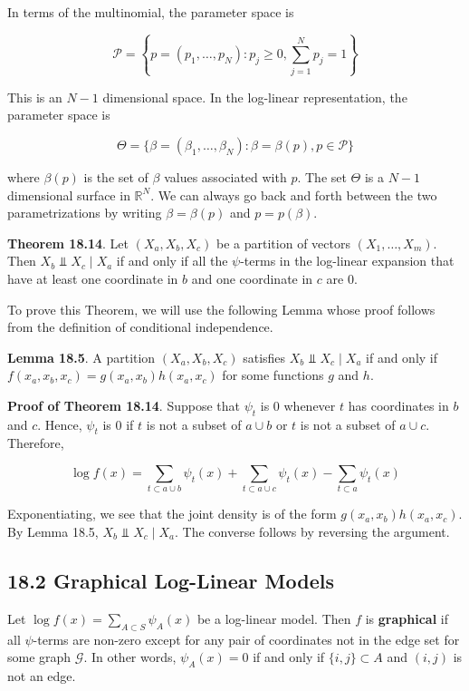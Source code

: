 In terms of the multinomial, the parameter space is

\[ \mathcal{P} = \left\{ p = (p_{1}, \dots, p_N) : p_{j} \geq 0, \sum_{j=1}^N p_{j} = 1 \right\} \]

This is an \(N - 1\) dimensional space. In the log-linear
representation, the parameter space is

\[ \Theta = \Bigg\{ \beta = (\beta_{1}, \dots, \beta_N) : \beta = \beta(p), p \in \mathcal{P} \Bigg\} \]

where \(\beta(p)\) is the set of \(\beta\) values associated with \(p\).
The set \(\Theta\) is a \(N - 1\) dimensional surface in
\(\mathbb{R}^N\). We can always go back and forth between the two
parametrizations by writing \(\beta = \beta(p)\) and \(p = p(\beta)\).

\textbf{Theorem 18.14}. Let \((X_a, X_b, X_c)\) be a partition of
vectors \((X_{1}, \dots, X_m)\). Then \(X_b \text{ ⫫ } X_c \; | \; X_a\)
if and only if all the \(\psi\)-terms in the log-linear expansion that
have at least one coordinate in \(b\) and one coordinate in \(c\) are 0.

To prove this Theorem, we will use the following Lemma whose proof
follows from the definition of conditional independence.

\textbf{Lemma 18.5}. A partition \((X_a, X_b, X_c)\) satisfies
\(X_b \text{ ⫫ } X_c \; | \; X_a\) if and only if
\(f(x_a, x_b, x_c) = g(x_a, x_b) h(x_a, x_c)\) for some functions \(g\)
and \(h\).

\textbf{Proof of Theorem 18.14}. Suppose that \(\psi_t\) is 0 whenever
\(t\) has coordinates in \(b\) and \(c\). Hence, \(\psi_t\) is 0 if
\(t\) is not a subset of \(a \cup b\) or \(t\) is not a subset of
\(a \cup c\). Therefore,

\[ \log f(x) = \sum_{t \subset a \cup b} \psi_t(x) + \sum_{t \subset a \cup c} \psi_t(x) - \sum_{t \subset a} \psi_t(x) \]

Exponentiating, we see that the joint density is of the form
\(g(x_a, x_b) h(x_a, x_c)\). By Lemma 18.5,
\(X_b \text{ ⫫ } X_c \; | \; X_a\). The converse follows by reversing
the argument.

\subsection*{18.2 Graphical Log-Linear Models}\label{graphical-log-linear-models}

Let \(\log f(x) = \sum_{A \subset S} \psi_A(x)\) be a log-linear model.
Then \(f\) is \textbf{graphical} if all \(\psi\)-terms are non-zero
except for any pair of coordinates not in the edge set for some graph
\(\mathcal{G}\). In other words, \(\psi_A(x) = 0\) if and only if
\(\{i, j\} \subset A\) and \((i, j)\) is not an edge.

